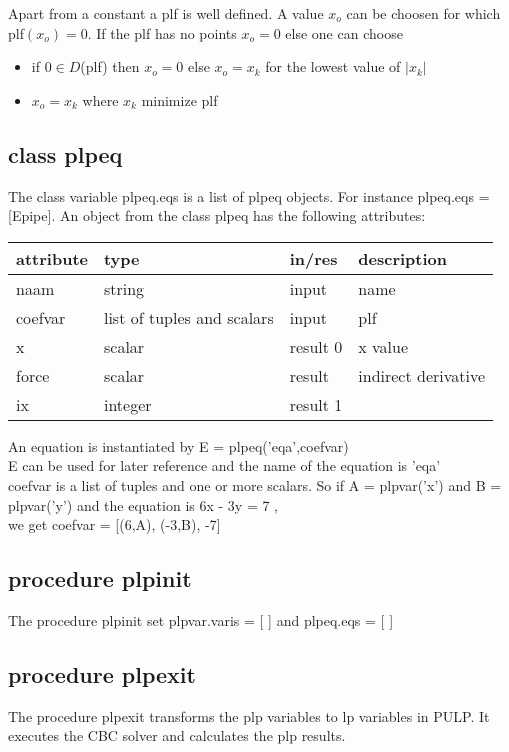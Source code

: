 \documentclass[]{article}
\begin{document}
Apart from a constant a plf is well defined.
A value $x_o$ can be choosen for which plf$(x_o)=0$.
If the plf has no points $x_o=0$ else one can choose
\begin{itemize}
\setlength\itemsep{-1mm}
  \item if $0 \in D$(plf) then $x_o=0$ else $x_o=x_k$ for the lowest value of $|x_k|$
  \item $x_o=x_k$ where $x_k$ minimize plf
\end{itemize}

\subsection{class plpeq}
The class variable plpeq.eqs is a list of plpeq objects.
For instance plpeq.eqs = [Epipe].
An object from the class plpeq has the following attributes:
\begin{center}
\begin{tabular}{|l|l|l|l|}\hline
  attribute & type     & in/res & description \\ \hline \hline
  naam    & string   & input  & name \\ \hline
  coefvar & list of tuples and scalars    & input  & plf  \\ \hline
  x       & scalar   & result 0 & x value\\ \hline
  force   & scalar   & result & indirect derivative\\ \hline
  ix      & integer  & result 1 &\\ \hline
\end{tabular}
\end{center}
An equation is instantiated by E = plpeq('eqa',coefvar)\\
E can be used for later reference and the name of the equation is 'eqa'\\
coefvar is a list of tuples and one or more scalars.
So if A = plpvar('x') and B = plpvar('y') and the equation is 6x - 3y = 7 ,\\
we get coefvar = [(6,A), (-3,B), -7]

\subsection{procedure plpinit}
The procedure plpinit set plpvar.varis = [ ] and plpeq.eqs = [ ]

\subsection{procedure plpexit}
The procedure plpexit transforms the plp variables to lp variables in PULP.
It executes the CBC solver and calculates the plp results.
\end{document}

